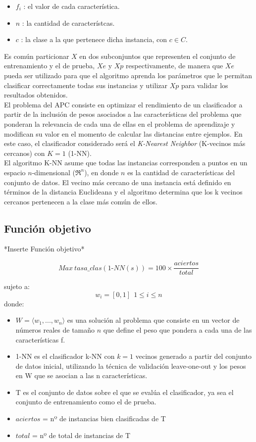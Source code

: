 \documentclass{ci5652}
\begin{document}
\begin{itemize}
  \item $f_i$ : el valor de cada característica.
  \item $n$ : la cantidad de característcas.
  \item $c$ : la clase a la que pertenece dicha instancia, con $c \in C$.
\end{itemize}

Es común particionar $X$ en dos subconjuntos que representen el conjunto de
entrenamiento y el de prueba, $Xe$ y $Xp$ respectivamente, de manera que $Xe$
pueda ser utilizado para que el algoritmo aprenda los parámetros que le
permitan clasificar correctamente todas sus instancias y utilizar $Xp$ para
validar los resultados obtenidos.\\

El problema del APC consiste en optimizar el rendimiento de un clasificador
a partir de la inclusión de pesos asociados a las características del problema
que ponderan la relevancia de cada una de ellas en el problema de aprendizaje y
modifican su valor en el momento de calcular las distancias entre ejemplos. En
este caso, el clasificador considerado será el \textit{K-Nearest Neighbor}
(K-vecinos más cercanos) con $K=1$ (1-NN).\\

El algoritmo K-NN asume que todas las instancias corresponden a puntos en un
espacio $n$-dimensional ($\Re^n$), en donde $n$ es la cantidad de
características del conjunto de datos. El vecino más cercano de una instancia
está definido en términos de la distancia Euclideana y el algoritmo determina
que los k vecinos cercanos pertenecen a la clase más común de ellos.
\cite{Mitchell_1997}

\subsection{Función objetivo}
*Inserte Función objetivo*

\begin{equation}
    Max\ tasa\_clas(1\textit{-}NN(s)) = 100 \times \frac{aciertos}{total}
\end{equation}

sujeto a:
\[
w_i = [0, 1] \ \ 1 \leq i \leq n
\]
donde:
\begin{itemize}
  \item $W = \langle w_1, ..., w_n\rangle$ es una solución al problema que
  consiste en un vector de números reales de tamaño $n$ que define el peso que
  pondera a cada una de las características f.
  \item 1-NN es el clasificador k-NN con $k=1$ vecinos generado a partir del conjunto de
  datos inicial, utilizando la técnica de validación leave-one-out y los pesos en W
  que se asocian a las n características.
  \item T es el conjunto de datos sobre el que se evalúa el clasificador, ya sea el
  conjunto de entrenamiento como el de prueba.
  \item $aciertos$ = nº de instancias bien clasificadas de T
  \item $total$ =  nº de total de instancias de T
\end{itemize}
\end{document}
